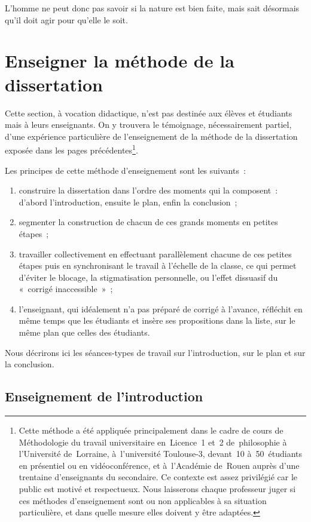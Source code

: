 \documentclass[a4paper,12pt]{report}
\begin{document}
L'homme ne peut donc pas savoir si la nature
est bien faite, mais sait désormais qu'il doit agir pour qu'elle le
soit.

\part{Enseigner la méthode de la dissertation}
\label{sec:orgc4f7924}
Cette section, à vocation didactique, n'est pas destinée aux élèves et
étudiants mais à leurs enseignants. On y trouvera le témoignage,
nécessairement partiel, d'une expérience particulière de l'enseignement
de la méthode de la dissertation exposée dans les pages
précédentes\footnote{Cette méthode a été appliquée principalement dans le cadre de
cours de Méthodologie du travail universitaire en Licence 1 et 2
de philosophie à l'Université de Lorraine, à l'université Toulouse-3,
devant 10 à 50 étudiants en présentiel ou en vidéoconférence, et
à l'Académie de Rouen auprès d'une trentaine d'enseignants du
secondaire. Ce contexte est assez privilégié car le public est motivé et
respectueux. Nous laisserons chaque professeur juger si ces méthodes
d'enseignement sont ou non applicables à sa situation particulière, et
dans quelle mesure elles doivent y être adaptées.}.

Les principes de cette méthode d'enseignement sont les suivants : 
\begin{enumerate}
\item construire la dissertation dans l'ordre des moments qui la
composent : d'abord l'introduction, ensuite le plan, enfin la
conclusion ;
\item segmenter la construction de chacun de ces grands moments en petites
étapes ;
\item travailler collectivement en effectuant parallèlement chacune de ces
petites étapes puis en synchronisant le travail à l'échelle de la
classe, ce qui permet d'éviter le blocage, la stigmatisation
personnelle, ou l'effet dissuasif du « corrigé inaccessible » ;
\item l'enseignant, qui idéalement n'a pas préparé de corrigé à l'avance,
réfléchit en même temps que les étudiants et insère ses propositions
dans la liste, sur le même plan que celles des étudiants.
\end{enumerate}

Nous décrirons ici les séances-types de travail sur l'introduction, sur
le plan et sur la conclusion. 

\chapter{Enseignement de l'introduction}
\label{sec:orga7a06f9}
\end{document}
